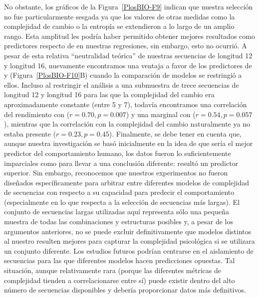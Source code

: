 No obstante, los gráficos de la Figura~\ref{PlosBIO-F9} indican que nuestra selección no fue particularmente sesgada ya que los valores de otras medidas como la complejidad de cambio o la entropía se extendieron a lo largo de un amplio rango. Esta amplitud les podría haber permitido obtener mejores resultados como predictores respecto de \mdlbin en nuestras regresiones, sin embargo, esto no ocurrió. A pesar de esta relativa ``neutralidad teórica'' de nuestras secuencias de longitud 12 y longitud 16, nuevamente encontramos una ventaja a favor de los predictores de \mdlbin y \mdlbinfrag (Figura~\ref{PlosBIO-F10}B) cuando la comparación de modelos se restringió a ellos. Incluso al restringir el análisis a una submuestra de trece secuencias de longitud 12 y longitud 16 para las que la complejidad del cambio era aproximadamente constante (entre 5 y 7), todavía encontramos una correlación del rendimiento con \mdlbinfrag ($r = 0.70, p = 0.007$) y una marginal con \mdlbin ($r = 0.54, p = 0.057$), mientras que la correlación con la complejidad del cambio naturalmente ya no estaba presente ($r = 0.23, p = 0.45$). Finalmente, se debe tener en cuenta que, aunque nuestra investigación se basó inicialmente en la idea de que \mdlbin sería el mejor predictor del comportamiento humano, los datos fueron lo suficientemente imparciales como para llevar a una conclusión diferente: \mdlbinfrag resultó un predictor superior. Sin embargo, reconocemos que nuestros experimentos no fueron diseñados específicamente para arbitrar entre diferentes modelos de complejidad de secuencias con respecto a su capacidad para predecir el comportamiento (especialmente en lo que respecta a la selección de secuencias más largas). El conjunto de secuencias largas utilizadas aquí representa sólo una pequeña muestra de todas las combinaciones y estructuras posibles y, a pesar de los argumentos anteriores, no se puede excluir definitivamente que modelos distintos al nuestro resulten mejores para capturar la complejidad psicológica si se utilizara un conjunto diferente. Los estudios futuros podrían centrarse en el aislamiento de secuencias para las que diferentes modelos hacen predicciones opuestas. Tal situación, aunque relativamente rara (porque las diferentes métricas de complejidad tienden a correlacionarse entre sí) puede existir dentro del alto número de secuencias disponibles y debería proporcionar datos más definitivos.


